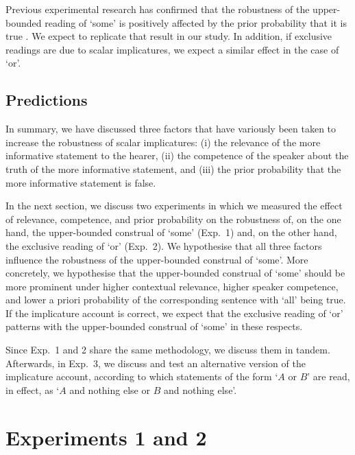 \documentclass[12pt]{article}
\begin{document}
Previous experimental research has confirmed that the robustness of the upper-bounded reading of `some' is positively affected by the prior probability that it is true \citep{degen2015}. We expect to replicate that result in our study. In addition, if exclusive readings are due to scalar implicatures, we expect a similar effect in the case of `or'.

\subsection*{Predictions}

In summary, we have discussed three factors that have variously been taken to increase the
robustness of scalar implicatures: (i) the relevance of the more informative statement to the
hearer, (ii) the competence of the speaker about the truth of the more informative statement,
and (iii) the prior probability that the more informative statement is false.

In the next section, we discuss two experiments in which we measured the effect of relevance,
competence, and prior probability on the robustness of, on the one hand, the upper-bounded
construal of `some' (Exp.\ 1) and, on the other hand, the exclusive reading of `or' (Exp.\
2). We hypothesise that all three factors influence the robustness of the upper-bounded
construal of `some'. More concretely, we hypothesise that the upper-bounded construal of `some'
should be more prominent under higher contextual relevance, higher speaker competence, and
lower a priori probability of the corresponding sentence with `all' being true. If the
implicature account is correct, we expect that the exclusive reading of `or' patterns with the
upper-bounded construal of `some' in these respects.

Since Exp.\ 1 and 2 share the same methodology, we discuss them in tandem. Afterwards, in Exp.\ 3, we discuss and test an alternative version of the implicature account, according to which statements of the form `$A$ or $B$' are read, in effect, as `$A$ and nothing else or $B$ and nothing else'. 

\section{Experiments 1 and 2}
\end{document}
